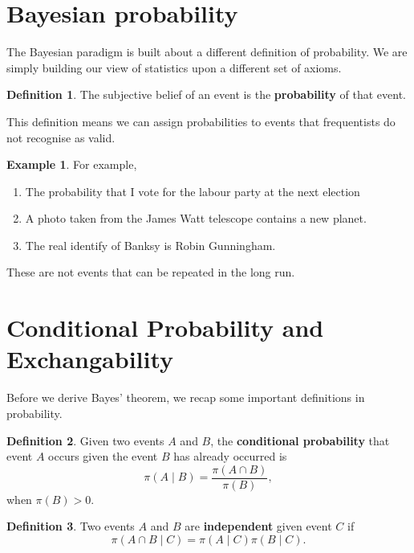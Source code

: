\documentclass[
]{book}
\theoremstyle{definition}
\newtheorem{definition}{Definition}[chapter]
\theoremstyle{definition}
\newtheorem{example}{Example}[chapter]
\theoremstyle{definition}
\theoremstyle{definition}
\theoremstyle{remark}
\begin{document}
\hypertarget{bayesian-probability}{%
\section{Bayesian probability}\label{bayesian-probability}}

The Bayesian paradigm is built about a different definition of probability. We are simply building our view of statistics upon a different set of axioms.

\begin{definition}
The subjective belief of an event is the \textbf{probability} of that event.
\end{definition}

This definition means we can assign probabilities to events that frequentists do not recognise as valid.

\begin{example}
For example,

\begin{enumerate}
\def\labelenumi{\arabic{enumi}.}
\item
  The probability that I vote for the labour party at the next election
\item
  A photo taken from the James Watt telescope contains a new planet.
\item
  The real identify of Banksy is Robin Gunningham.
\end{enumerate}

These are not events that can be repeated in the long run.
\end{example}

\hypertarget{conditional-probability-and-exchangability}{%
\section{Conditional Probability and Exchangability}\label{conditional-probability-and-exchangability}}

Before we derive Bayes' theorem, we recap some important definitions in probability.

\begin{definition}
Given two events \(A\) and \(B\), the \textbf{conditional probability} that event \(A\) occurs given the event \(B\) has already occurred is
\[
\pi(A \mid B) = \frac{\pi(A \cap B)}{\pi(B)}, 
\]
when \(\pi(B) > 0\).
\end{definition}

\begin{definition}
Two events \(A\) and \(B\) are \textbf{independent} given event \(C\) if
\[ \pi(A \cap B \mid C) = \pi(A \mid C)\pi(B \mid C).\]
\end{definition}
\end{document}
